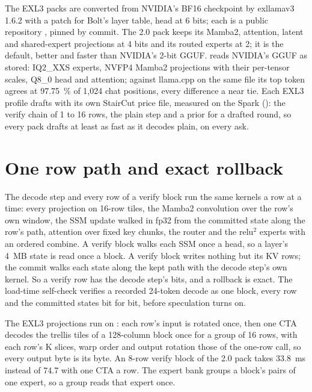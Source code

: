 The EXL3 packs are converted from NVIDIA's BF16 checkpoint by exllamav3 1.6.2 with a patch for Bolt's layer table, head at 6 bits; each is a public repository , pinned by commit. The 2.0 pack keeps its Mamba2, attention, latent and shared-expert projections at 4 bits and its routed experts at 2; it is the default, better and faster than NVIDIA's 2-bit GGUF.  reads NVIDIA's GGUF as stored: IQ2\_XXS experts, NVFP4 Mamba2 projections with their per-tensor scales, Q8\_0 head and attention; against llama.cpp on the same file its top token agrees at 97.75~\% of 1,024 chat positions, every difference a near tie. Each EXL3 profile drafts with its own StairCut price file, measured on the Spark (): the verify chain of 1 to 16 rows, the plain step and a  prior for a drafted round, so every pack drafts at least as fast as it decodes plain, on every ask.

\section{One row path and exact rollback}

The decode step and every row of a verify block run the same kernels a row at a time: every projection on 16-row tiles, the Mamba2 convolution over the row's own window, the SSM update walked in fp32 from the committed state along the row's path, attention over fixed key chunks, the router and the relu$^2$ experts with an ordered combine. A verify block walks each SSM once a head, so a layer's 4~MB state is read once a block. A verify block writes nothing but its KV rows; the commit walks each state along the kept path with the decode step's own kernel. So a verify row has the decode step's bits, and a rollback is exact. The load-time self-check verifies a recorded 24-token decode as one block, every row and the committed states bit for bit, before speculation turns on.

The EXL3 projections run on : each row's input is rotated once, then one CTA decodes the trellis tiles of a 128-column block once for a group of 16 rows, with each row's K slices, warp order and output rotation those of the one-row  call, so every output byte is its byte. An 8-row verify block of the 2.0 pack takes 33.8~ms instead of 74.7 with one CTA a row. The expert bank groups a block's pairs of one expert, so a group reads that expert once.

